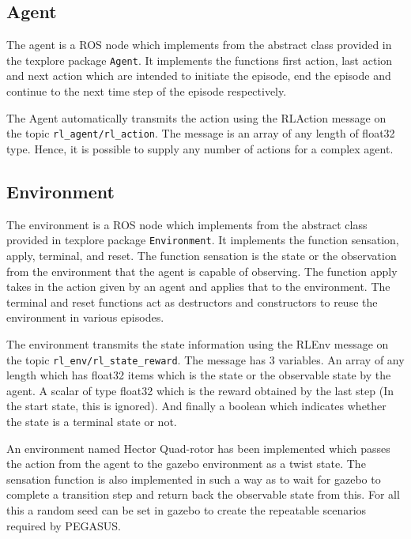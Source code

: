 \documentclass[hidelinks,BTech]{iitmdiss}
\begin{document}
\subsection*{Agent}

The agent is a ROS node which implements from the abstract class provided in the texplore package \texttt{Agent}. It implements the functions first action, last action and next action which are intended to initiate the episode, end the episode and continue to the next time step of the episode respectively.

The Agent automatically transmits the action using the RLAction message on the topic \texttt{rl\_agent/rl\_action}. The message is an array of any length of float32 type. Hence, it is possible to supply any number of actions for a complex agent.

\subsection*{Environment}

The environment is a ROS node which implements from the abstract class provided in texplore package \texttt{Environment}. It implements the function sensation, apply, terminal, and reset. The function sensation is the state or the observation from the environment that the agent is capable of observing. The function apply takes in the action given by an agent and applies that to the environment. The terminal and reset functions act as destructors and constructors to reuse the environment in various episodes.

The environment transmits the state information using the RLEnv message on the topic \texttt{rl\_env/rl\_state\_reward}. The message has 3 variables. An array of any length which has float32 items which is the state or the observable state by the agent. A scalar of type float32 which is the reward obtained by the last step (In the start state, this is ignored). And finally a boolean which indicates whether the state is a terminal state or not.

An environment named Hector Quad-rotor has been implemented which passes the action from the agent to the gazebo environment as a twist state. The sensation function is also implemented in such a way as to wait for gazebo to complete a transition step and return back the observable state from this. For all this a random seed can be set in gazebo to create the repeatable scenarios required by PEGASUS.

\end{document}
